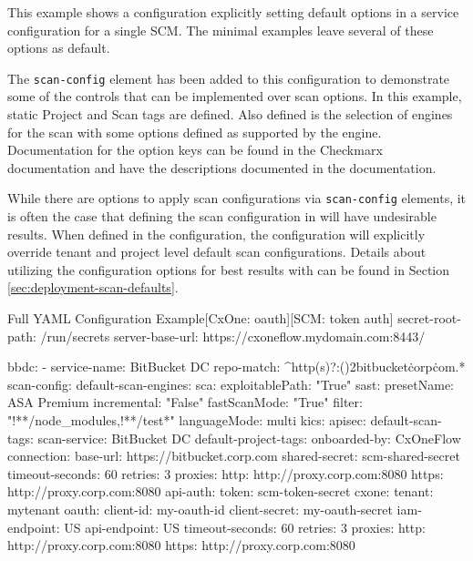 This example shows a \cxoneflow configuration explicitly setting default options in a service 
configuration for a single SCM.  The minimal examples leave several of these options as default.

The \texttt{scan-config} element has been added to this configuration to
demonstrate some of the controls that can be implemented over scan options.  In this
example, static Project and Scan tags are defined.  Also defined is the selection
of engines for the scan with some options defined as supported by the engine.
Documentation for the option keys can be found in the Checkmarx
documentation and have the descriptions documented in the
documentation.

While there are options to apply scan configurations via \texttt{scan-config} elements, it is often the case that defining the scan configuration
in \cxoneflow will have undesirable results.  When defined in the \cxoneflow configuration, the configuration will explicitly override \cxone
tenant and project level default scan configurations.  Details about utilizing the \cxone configuration options for best results with \cxoneflow
can be found in Section \ref{sec:deployment-scan-defaults}.

\begin{code}{Full YAML Configuration Example}{[CxOne: oauth]}{[SCM: token auth]}
secret-root-path: /run/secrets
server-base-url: https://cxoneflow.mydomain.com:8443/

bbdc:
    - service-name: BitBucket DC
      repo-match: ^http(s)?:(\/){2}bitbucket\.corp\.com.*
      scan-config:
          default-scan-engines:
              sca:
                  exploitablePath: "True"
              sast:
                  presetName: ASA Premium
                  incremental: "False"
                  fastScanMode: "True"
                  filter: "!**/node_modules,!**/test*"
                  languageMode: multi
              kics:
              apisec:
          default-scan-tags:
              scan-service: BitBucket DC
          default-project-tags:
              onboarded-by: CxOneFlow
      connection:
          base-url: https://bitbucket.corp.com
          shared-secret: scm-shared-secret
          timeout-seconds: 60
          retries: 3
          proxies:
            http: http://proxy.corp.com:8080
            https: http://proxy.corp.com:8080
          api-auth:
              token: scm-token-secret
      cxone:
          tenant: mytenant
          oauth:
              client-id: my-oauth-id
              client-secret: my-oauth-secret
          iam-endpoint: US
          api-endpoint: US
          timeout-seconds: 60
          retries: 3
          proxies:
            http: http://proxy.corp.com:8080
            https: http://proxy.corp.com:8080
\end{code}


